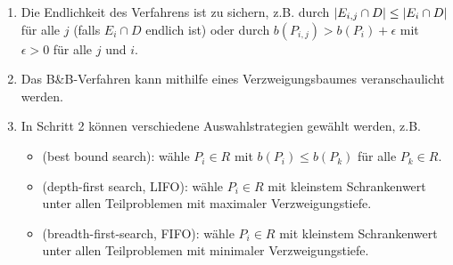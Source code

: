 \begin{*bemerkung}
	\begin{enumerate}
		\item Die Endlichkeit des Verfahrens ist zu sichern, z.B. durch $\left| E_{i,j} \cap D \right| \le \left| E_i \cap D \right|$ für alle $j$ (falls $E_i \cap D$ endlich ist) oder durch $b(P_{i,j}) > b(P_i) + \epsilon$ mit $\epsilon > 0$ für alle $j$ und $i$.
		\item Das B\&B-Verfahren kann mithilfe eines Verzweigungsbaumes veranschaulicht werden.
		\item In Schritt 2 können verschiedene Auswahlstrategien gewählt werden, z.B. 
		\begin{itemize}[noitemsep]
			\item {} (best bound search): wähle $P_i \in R$ mit $b(P_i) \le b(P_k)$ für alle $P_k \in R$.
			\item {} (depth-first search, LIFO): wähle $P_i \in R$ mit kleinstem Schrankenwert unter allen Teilproblemen mit maximaler Verzweigungstiefe.
			\item {} (breadth-first-search, FIFO): wähle $P_i \in R$ mit kleinstem Schrankenwert unter allen Teilproblemen mit minimaler Verzweigungstiefe.
		\end{itemize}
	\end{enumerate}
\end{*bemerkung}